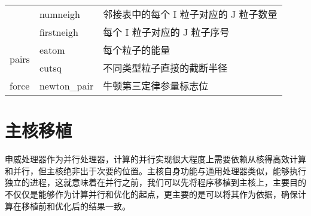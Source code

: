 \begin{table}[]
\begin{tabular}{@{}l|l|l@{}}
                       & numneigh     & 邻接表中的每个 I 粒子对应的 J 粒子数量                                                                       \\ \cmidrule(l){2-3} 
                       & firstneigh   & 每个 I 粒子对应的 J 粒子序号                                                                            \\ \midrule
\multirow{2}{*}{pairs} & eatom        & 每个粒子的能量                                                                                      \\ \cmidrule(l){2-3} 
                       & cutsq        & 不同类型粒子直接的截断半径                                                                                \\ \midrule
force                  & newton\_pair & 牛顿第三定律参量标志位                                                                                  \\ \bottomrule
\end{tabular}
\end{table}


\section{主核移植}
申威处理器作为并行处理器，计算的并行实现很大程度上需要依赖从核得高效计算和并行，但主核绝非出于次要的位置。主核自身功能与通用处理器类似，能够执行独立的进程，这就意味着在并行之前，我们可以先将程序移植到主核上，主要目的不仅仅是能够作为计算并行和优化的起点，更主要的是可以将其作为依据，确保计算在移植前和优化后的结果一致。

